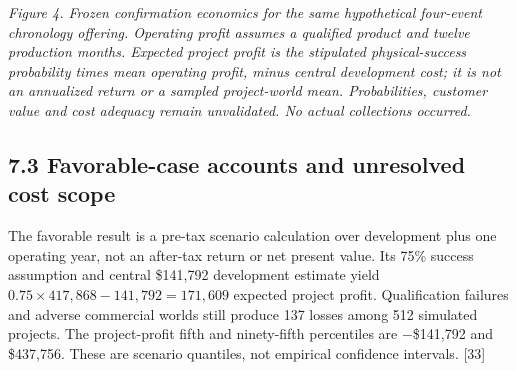 \documentclass[
  11pt,
]{article}
\begin{document}
\emph{Figure 4. Frozen confirmation economics for the same hypothetical
four-event chronology offering. Operating profit assumes a qualified
product and twelve production months. Expected project profit is the
stipulated physical-success probability times mean operating profit,
minus central development cost; it is not an annualized return or a
sampled project-world mean. Probabilities, customer value and cost
adequacy remain unvalidated. No actual collections occurred.}

\hypertarget{favorable-case-accounts-and-unresolved-cost-scope}{%
\subsection{7.3 Favorable-case accounts and unresolved cost
scope}\label{favorable-case-accounts-and-unresolved-cost-scope}}

The favorable result is a pre-tax scenario calculation over development
plus one operating year, not an after-tax return or net present value.
Its 75\% success assumption and central \$141,792 development estimate
yield \(0.75\times417,868-141,792=171,609\) expected project profit.
Qualification failures and adverse commercial worlds still produce 137
losses among 512 simulated projects. The project-profit fifth and
ninety-fifth percentiles are −\$141,792 and \$437,756. These are
scenario quantiles, not empirical confidence intervals. {[}33{]}
\end{document}
